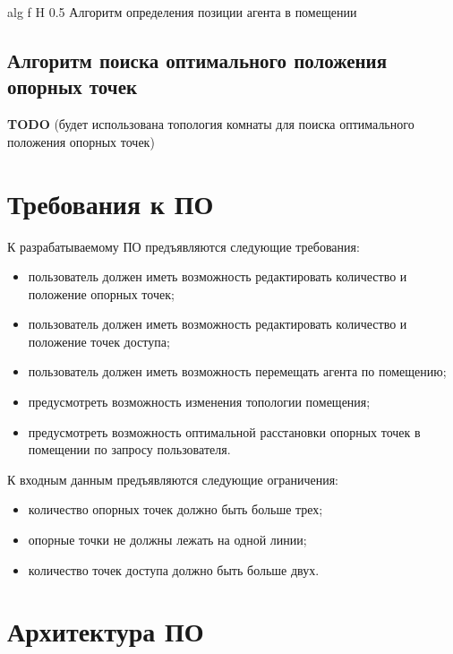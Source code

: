     {alg}
    {f}
    {H}
    {0.5\linewidth}
    {Алгоритм определения позиции агента в помещении}

\subsection{Алгоритм поиска оптимального положения опорных точек}

\textbf{TODO} (будет использована топология комнаты для поиска оптимального положения опорных точек)

\section{Требования к ПО}

К разрабатываемому ПО предъявляются следующие требования:

\begin{itemize}[label=---]
    \item пользователь должен иметь возможность редактировать количество и положение опорных точек;
    \item пользователь должен иметь возможность редактировать количество и положение точек доступа;
    \item пользователь должен иметь возможность перемещать агента по помещению;
    \item предусмотреть возможность изменения топологии помещения;
    \item предусмотреть возможность оптимальной расстановки опорных точек в помещении по запросу пользователя.
\end{itemize}

К входным данным предъявляются следующие ограничения:

\begin{itemize}[label=---]
    \item количество опорных точек должно быть больше трех;
    \item опорные точки не должны лежать на одной линии;
    \item количество точек доступа должно быть больше двух.
\end{itemize}

\clearpage

\section{Архитектура ПО}


